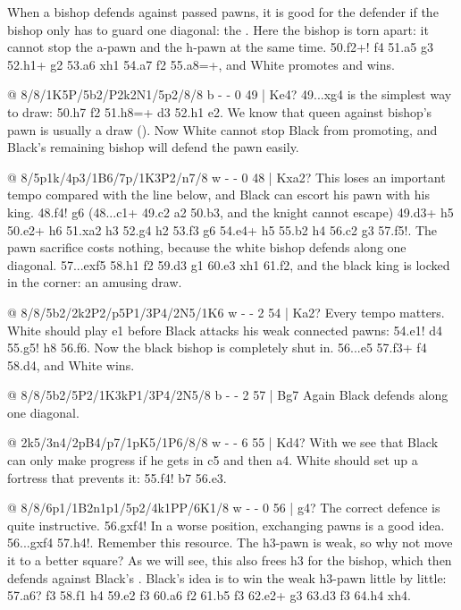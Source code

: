 When a bishop defends against passed pawns, it is good for the defender if the bishop only has to
guard one diagonal: the . Here the bishop is torn apart: it cannot
stop the a-pawn and the h-pawn at the same time. 50.\N f2+! \K f4 51.a5 \K g3 52.\N h1+ \K g2 53.a6
\K xh1 54.a7 f2 55.a8=\Q+, and White promotes and wins.

@ 8/8/1K5P/5b2/P2k2N1/5p2/8/8 b - - 0 49 | Ke4?
49...\B xg4 is the simplest way to draw: 50.h7 f2 51.h8=\Q+ \K d3 52.\Q h1 \B e2. We know that
queen against bishop's pawn is usually a draw (). Now White cannot stop Black from promoting, and
Black's remaining bishop will defend the pawn easily.

@ 8/5p1k/4p3/1B6/7p/1K3P2/n7/8 w - - 0 48 | Kxa2?
This loses an important tempo compared with the line below, and Black can escort his pawn with
his king. 48.f4! \K g6 (48...\N c1+ 49.\K c2 \N a2 50.\K b3, and the knight cannot escape)
49.\B d3+ \K h5 50.\B e2+ \K h6 51.\K xa2 h3 52.\B g4 h2 53.\B f3 \K g6 54.\B e4+ \K h5 55.\K b2
\K h4 56.\K c2 \K g3 57.f5!. The pawn sacrifice costs nothing, because the white bishop defends
along one diagonal. 57...exf5 58.\B h1 \K f2 59.\K d3
\K g1 60.\K e3 \K xh1 61.\K f2, and the black king is locked in the corner: an amusing draw.

@ 8/8/5b2/2k2P2/p5P1/3P4/2N5/1K6 w - - 2 54 | Ka2?
Every tempo matters. White should play \N e1 before Black attacks his weak connected pawns:
54.\N e1! \K d4 55.g5! \B h8 56.f6. Now the black bishop is completely shut in. 56...\K e5
57.\N f3+ \K f4 58.d4, and White wins.

@ 8/8/5b2/5P2/1K3kP1/3P4/2N5/8 b - - 2 57 | Bg7
Again Black defends along one diagonal.

@ 2k5/3n4/2pB4/p7/1pK5/1P6/8/8 w - - 6 55 | Kd4?
With  we see that Black can only make progress if he gets
in c5 and then a4. White should set up a fortress that prevents it: 55.\B f4!
\K b7 56.\B e3.

@ 8/8/6p1/1B2n1p1/5p2/4k1PP/6K1/8 w - - 0 56 | g4?
The correct defence is quite instructive. 56.gxf4! In a worse position, exchanging pawns is a good
idea. 56...gxf4 57.h4!. Remember this resource. The h3-pawn is weak, so why not move it to a better
square? As we will see, this also frees h3 for the bishop, which then defends against Black's
.
Black's idea is to win the weak h3-pawn little by little: 57.\B a6? \N f3 58.\K f1 \N h4 59.\B e2
f3 60.\B a6 f2 61.\B b5 \K f3 62.\B e2+ \K g3 63.\B d3 \N f3 64.h4 \N xh4.

